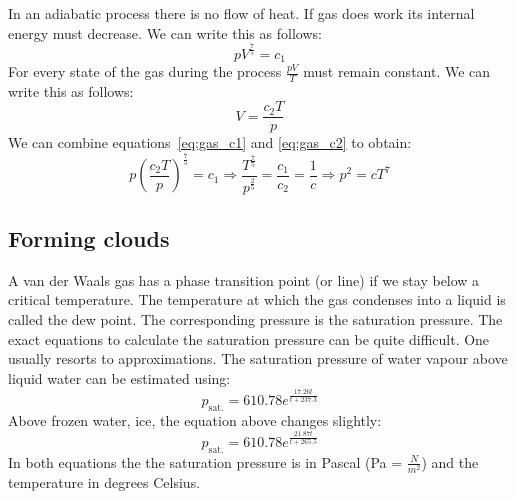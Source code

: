 \documentclass[12pt,a4paper]{article}
\numberwithin{equation}{section}
\numberwithin{figure}{section}
\numberwithin{table}{section}
\begin{document}
In an adiabatic process there is no flow of heat. If gas does work its internal energy must decrease. We can write this as follows:
\begin{equation}
pV^{\frac{7}{5}}=c_1 \label{eq:gas_c1}
\end{equation}
For every state of the gas during the process $\frac{pV}{T}$ must remain constant. We can write this as follows:
\begin{equation}
V=\frac{c_2 T}{p} \label{eq:gas_c2}
\end{equation}
We can combine equations~\ref{eq:gas_c1} and \ref{eq:gas_c2} to obtain:
\begin{equation}
p\left( \frac{c_2 T}{p}\right)^{\frac{7}{5}} = c_1 \Rightarrow \frac{T^{\frac{7}{5}}}{p^{\frac{2}{5}}} = \frac{c_1}{c_2} = \frac{1}{c} \Rightarrow p^2 = cT^7
\end{equation}

\subsection{Forming clouds}
A van der Waals gas has a phase transition point (or line) if we stay below a critical temperature. The temperature at which the gas condenses into a liquid is called the dew point. The corresponding pressure is the saturation pressure. The exact equations to calculate the saturation pressure can be quite difficult. One usually resorts to approximations.
The saturation pressure of water vapour above liquid water can be estimated using:
\begin{equation}
p_{\mbox{sat.}} = 610.78 e^{\frac{17.26t}{t+237.3}}
\end{equation}
Above frozen water, ice, the equation above changes slightly:
\begin{equation}
p_{\mbox{sat.}} = 610.78 e^{\frac{21.87t}{t+265.5}}
\end{equation}
In both equations the the saturation pressure is in Pascal (Pa = $\frac{N}{m^2}$) and the temperature in degrees Celsius. 
\end{document}
